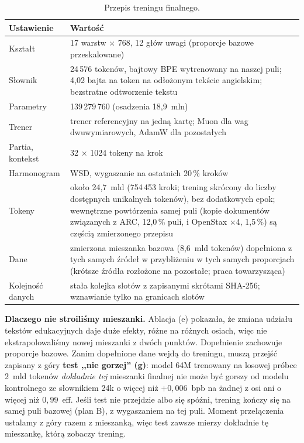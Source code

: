\begin{table}[ht]
\centering\small
\begin{tabular}{@{}L{3.2cm}L{11.0cm}@{}}
\toprule
Ustawienie & Wartość \\
\midrule
Kształt & 17 warstw $\times$ 768, 12 głów uwagi (proporcje bazowe przeskalowane) \\
Słownik & 24\,576 tokenów, bajtowy BPE wytrenowany na naszej puli; 4,02 bajta na token na odłożonym tekście angielskim; bezstratne odtworzenie tekstu \\
Parametry & 139\,279\,760 (osadzenia 18,9~mln) \\
Trener & trener referencyjny na jedną kartę; Muon dla wag dwuwymiarowych, AdamW dla pozostałych \\
Partia, kontekst & 32 $\times$ 1024 tokeny na krok \\
Harmonogram & WSD, wygaszanie na ostatnich 20\,\% kroków \\
Tokeny & około 24,7~mld (754\,453 kroki; trening skrócony do liczby dostępnych unikalnych tokenów), bez dodatkowych epok; wewnętrzne powtórzenia samej puli (kopie dokumentów związanych z ARC, 12,0\,\% puli, i OpenStax $\times$4, 1,5\,\%) są częścią zmierzonego przepisu \\
Dane & zmierzona mieszanka bazowa (8,6~mld tokenów) dopełniona z tych samych źródeł w przybliżeniu w tych samych proporcjach (krótsze źródła rozłożone na pozostałe; praca towarzysząca) \\
Kolejność danych & stała kolejka slotów z zapisanymi skrótami SHA-256; wznawianie tylko na granicach slotów \\
\bottomrule
\end{tabular}
\caption{Przepis treningu finalnego.}
\label{tab:recipe}
\end{table}

\textbf{Dlaczego nie stroiliśmy mieszanki.} Ablacja (e) pokazała, że zmiana udziału tekstów edukacyjnych daje duże
efekty, różne na różnych osiach, więc nie ekstrapolowaliśmy nowej mieszanki z dwóch punktów. Dopełnienie zachowuje
proporcje bazowe. Zanim dopełnione dane wejdą do treningu, muszą przejść zapisany z góry \textbf{test ,,nie gorzej''
(g)}: model 64M trenowany na losowej próbce 2~mld tokenów \emph{dokładnie tej} mieszanki finalnej nie może być gorszy
od modelu kontrolnego ze słownikiem 24k o więcej niż $+0{,}006$~bpb na żadnej z osi ani o więcej niż $0{,}99$~eff.
Jeśli test nie przejdzie albo się spóźni, trening kończy się na samej puli bazowej (plan B), z wygaszaniem na tej
puli. Moment przełączenia ustalamy z góry razem z mieszanką, więc test zawsze mierzy dokładnie tę mieszankę, którą
zobaczy trening.

